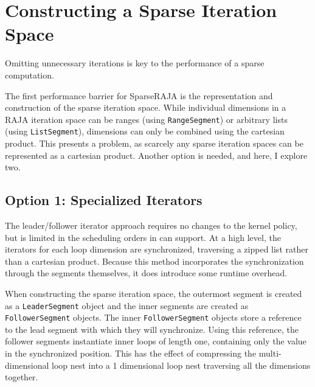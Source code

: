 \section{Constructing a Sparse Iteration Space}
\label{sec:sparseIterspace}
Omitting unnecessary iterations is key to the performance of a sparse computation. 


The first performance barrier for SparseRAJA is the representation and construction of the sparse iteration space.
While individual dimensions in a RAJA iteration space can be ranges (using \verb.RangeSegment.) or arbitrary lists (using \verb.ListSegment.), dimensions can only be combined using the cartesian product. 
This presents a problem, as scarcely any sparse iteration spaces can be represented as a cartesian product.
Another option is needed, and here, I explore two.


\subsection{Option 1: Specialized Iterators}
The leader/follower iterator approach requires no changes to the kernel policy, but is limited in the scheduling orders in can support. 
At a high level, the iterators for each loop dimension are synchronized, traversing a zipped list rather than a cartesian product. 
Because this method incorporates the synchronization through the segments themselves, it does introduce some runtime overhead.

When constructing the sparse iteration space, the outermost segment is created as a \verb.LeaderSegment. object and the inner segments are created as \verb.FollowerSegment. objects.
The inner \verb.FollowerSegment. objects store a reference to the lead segment with which they will synchronize.
Using this reference, the follower segments instantiate inner loops of length one, containing only the value in the synchronized position. 
This has the effect of compressing the multi-dimensional loop nest into a 1 dimensional loop nest traversing all the dimensions together.

